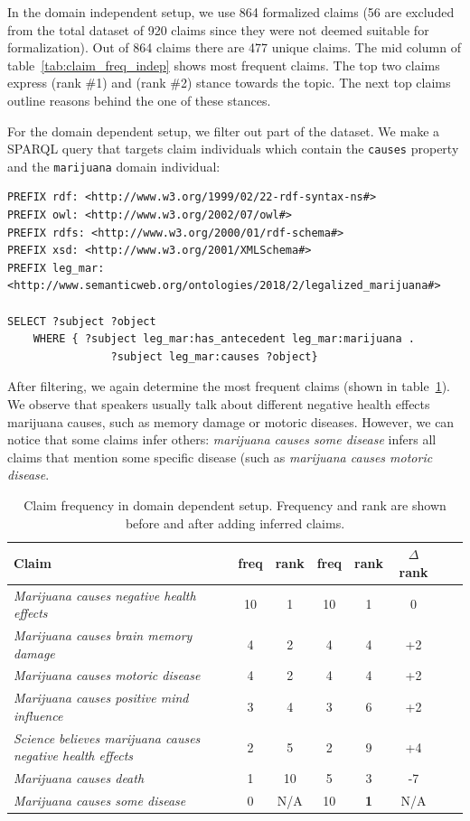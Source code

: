 In the domain independent setup, we use 864 formalized claims (56 are excluded
from the total dataset of 920 claims since they were not deemed
suitable for formalization). Out of 864 claims there are 477 unique claims. 
The mid column of table~\ref{tab:claim_freq_indep} shows most frequent claims.
The top two claims express  (rank \#1) and  (rank \#2) stance 
towards the topic. The next top claims outline reasons behind the one of these 
stances. 

For the domain dependent setup, we filter out part of the dataset. We make a
SPARQL query that targets claim individuals which contain the \texttt{causes} property
and the \texttt{marijuana} domain individual: 
{
\small{
\begin{verbatim}
PREFIX rdf: <http://www.w3.org/1999/02/22-rdf-syntax-ns#>
PREFIX owl: <http://www.w3.org/2002/07/owl#>
PREFIX rdfs: <http://www.w3.org/2000/01/rdf-schema#>
PREFIX xsd: <http://www.w3.org/2001/XMLSchema#>
PREFIX leg_mar:
<http://www.semanticweb.org/ontologies/2018/2/legalized_marijuana#>

SELECT ?subject ?object
	WHERE { ?subject leg_mar:has_antecedent leg_mar:marijuana .
                ?subject leg_mar:causes ?object}
\end{verbatim}
}
}

After filtering, we again determine the most frequent claims (shown in 
table~\ref{tab:claim_freq_dep}). We observe that speakers usually talk 
about different negative health effects marijuana causes, such as 
memory damage or motoric diseases. However, we can notice that 
some claims infer others: \emph{marijuana causes some disease} infers
all claims that mention some specific disease (such as 
\emph{marijuana causes motoric disease}. 

\begin{table}[t]
\centering
\begin{tabular}{p{9 cm} | cc | cc | cc | c}
	\toprule
	\textbf{Claim} & freq & rank & freq & rank & $\Delta$rank \\
\midrule
	\emph{Marijuana causes negative health effects                  }& 10 & 1 & 10 & 1 & 0\\
	\emph{Marijuana causes brain memory damage                      }& 4 & 2 & 4 & 4 & +2\\
	\emph{Marijuana causes motoric disease                          }& 4 & 2 & 4 & 4 & +2\\
	\emph{Marijuana causes positive mind influence                  }& 3 & 4 & 3 & 6 & +2 \\
	\emph{Science believes marijuana causes negative health effects }& 2 & 5 & 2 & 9 & +4 \\
	\emph{Marijuana causes death                                    }& 1 & 10 & 5 & 3 & -7 \\
	\emph{Marijuana causes some disease                             }& 0 & N/A & 10 & \textbf{1} & N/A \\
\bottomrule 
\end{tabular}
\caption{Claim frequency in domain dependent setup. Frequency and rank are
	shown before and after adding inferred claims.  }
\label{tab:claim_freq_dep}
\end{table}

